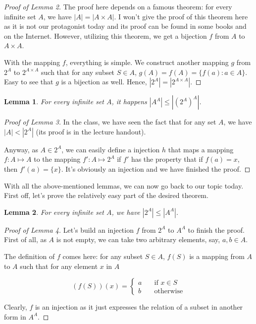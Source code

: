 \documentclass[12pt]{article}
\newtheorem{lemma}{Lemma}
\begin{document}
	\begin{proof}[Proof of Lemma 2]
		
		The proof here depends on a famous theorem: for every infinite set $A$, we have $|A|=|A\times A|$. I won't give the proof of this theorem here as it is not our protagonist today and its proof can be found in some books and on the Internet. However, utilizing this theorem, we get a bijection $f$ from $A$ to $A\times A$.
		
		With the mapping $f$, everything is simple. We construct another mapping $g$ from $2^A$ to $2^{A\times A}$ such that for any subset $S\in A$, $g(A)=f(A)=\{f(a):a\in A\}$. Easy to see that $g$ is a bijection as well. Hence, $|2^A|=|2^{A\times A}|$.
		
	\end{proof}
	
	\begin{lemma}
		For every infinite set $A$, it happens $|A^A|\le|(2^A)^A|$.
	\end{lemma}
	
	\begin{proof}[Proof of Lemma 3]
		In the class, we have seen the fact that for any set $A$, we have $|A|<|2^A|$ (its proof is in the lecture handout).
		
		Anyway, as $A\in 2^A$, we can easily define a injection $h$ that maps a mapping $f:A\mapsto A$ to the mapping $f':A\mapsto 2^A$ if $f'$ has the property that if $f(a)=x$, then $f'(a)=\{x\}$. It's obviously an injection and we have finished the proof.
	\end{proof}
	
	With all the above-mentioned lemmas, we can now go back to our topic today. First off, let's prove the relatively easy part of the desired theorem.
	
	\begin{lemma}
		For every infinite set $A$, we have $|2^A|\le |A^A|$.
	\end{lemma}
	
	\begin{proof}[Proof of Lemma 4]
		
		Let's build an injection $f$ from $2^A$ to $A^A$ to finish the proof. First of all, as $A$ is not empty, we can take two arbitrary elements, say, $a,b\in A$.
		
		The definition of $f$ comes here: for any subset $S\in A$, $f(S)$ is a mapping from $A$ to $A$ such that for any element $x$ in $A$
		
		$$ (f(S))(x)=\left\{
		\begin{aligned}
		a &\quad\text{if   } x\in S \\
		b &\quad\text{otherwise}
		\end{aligned}
		\right.
		$$
		
		Clearly, $f$ is an injection as it just expresses the relation of a subset in another form in $A^A$.
		
	\end{proof}
	
\end{document}
